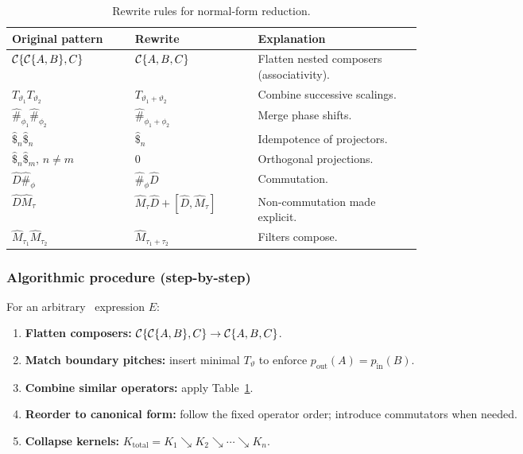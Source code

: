 \begin{table}[H]
  \small
  \centering
  \caption{Rewrite rules for normal-form reduction.}
  \label{tab:rewrite-rules}
  \renewcommand{\arraystretch}{1.15}
  \begin{tabularx}{\linewidth}{@{}p{0.30\linewidth} p{0.30\linewidth} X@{}}
    \toprule
    \textbf{Original pattern}                  & \textbf{Rewrite}                          & \textbf{Explanation} \\
    \midrule
    \(\mathcal{C}\{\mathcal{C}\{A,B\},C\}\)        & \(\mathcal{C}\{A,B,C\}\)                    & Flatten nested composers (associativity). \\
    \(T_{\vartheta_1}T_{\vartheta_2}\)         & \(T_{\vartheta_1+\vartheta_2}\)           & Combine successive scalings. \\
    \(\hat{\#}_{\phi_1}\hat{\#}_{\phi_2}\)     & \(\hat{\#}_{\phi_1+\phi_2}\)              & Merge phase shifts. \\
    \(\hat{\$}_n\hat{\$}_n\)                   & \(\hat{\$}_n\)                            & Idempotence of projectors. \\
    \(\hat{\$}_n\hat{\$}_m,\,n\neq m\)         & \(0\)                                     & Orthogonal projections. \\
    \(\hat{D}\hat{\#}_{\phi}\)                 & \(\hat{\#}_{\phi}\hat{D}\)                & Commutation. \\
    \(\hat{D}\hat{M}_{\tau}\)                  & \(\hat{M}_{\tau}\hat{D}+[\hat{D},\hat{M}_{\tau}]\) & Non-commutation made explicit. \\
    \(\hat{M}_{\tau_1}\hat{M}_{\tau_2}\)       & \(\hat{M}_{\tau_1+\tau_2}\)               & Filters compose. \\
    \bottomrule
  \end{tabularx}
\end{table}

\subsubsection{Algorithmic procedure (step-by-step)}

For an arbitrary \RCM\ expression \(E\):

\begin{enumerate}[leftmargin=1.5em]
  \item \textbf{Flatten composers:} \(\mathcal{C}\{\mathcal{C}\{A,B\},C\}\to\mathcal{C}\{A,B,C\}\).
  \item \textbf{Match boundary pitches:} insert minimal \(T_{\vartheta}\) to enforce \(p_{\mathrm{out}}(A)=p_{\mathrm{in}}(B)\).
  \item \textbf{Combine similar operators:} apply Table~\ref{tab:rewrite-rules}.
  \item \textbf{Reorder to canonical form:} follow the fixed operator order; introduce commutators when needed.
  \item \textbf{Collapse kernels:} \(K_{\mathrm{total}}=K_{1}\searrow K_{2}\searrow\cdots\searrow K_{n}\).
\end{enumerate}

